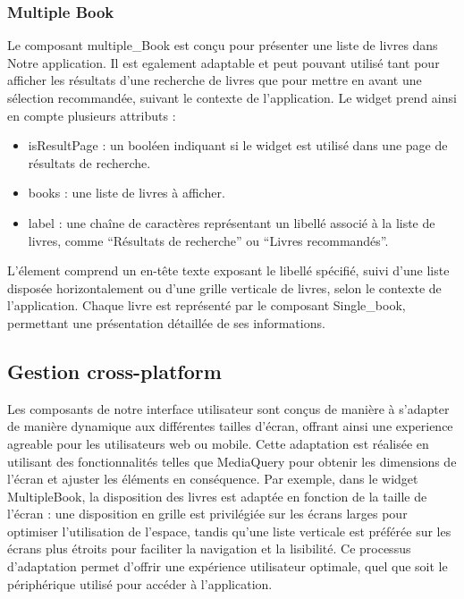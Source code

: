 \subsubsection{Multiple Book}\label{multiple-book}

Le composant multiple\_Book est conçu pour présenter une liste de livres
dans Notre application. Il est egalement adaptable et peut pouvant
utilisé tant pour afficher les résultats d'une recherche de livres que
pour mettre en avant une sélection recommandée, suivant le contexte de
l'application. Le widget prend ainsi en compte plusieurs attributs :

\begin{itemize}
\tightlist
\item
  isResultPage : un booléen indiquant si le widget est utilisé dans une
  page de résultats de recherche.
\item
  books : une liste de livres à afficher.
\item
  label : une chaîne de caractères représentant un libellé associé à la
  liste de livres, comme ``Résultats de recherche'' ou ``Livres
  recommandés''.
\end{itemize}

L'élement comprend un en-tête texte exposant le libellé spécifié, suivi
d'une liste disposée horizontalement ou d'une grille verticale de
livres, selon le contexte de l'application. Chaque livre est représenté
par le composant Single\_book, permettant une présentation détaillée de
ses informations.

\subsection{Gestion cross-platform}\label{gestion-cross-platform}

Les composants de notre interface utilisateur sont conçus de manière à
s'adapter de manière dynamique aux différentes tailles d'écran, offrant
ainsi une experience agreable pour les utilisateurs web ou mobile. Cette
adaptation est réalisée en utilisant des fonctionnalités telles que
MediaQuery pour obtenir les dimensions de l'écran et ajuster les
éléments en conséquence. Par exemple, dans le widget MultipleBook, la
disposition des livres est adaptée en fonction de la taille de l'écran :
une disposition en grille est privilégiée sur les écrans larges pour
optimiser l'utilisation de l'espace, tandis qu'une liste verticale est
préférée sur les écrans plus étroits pour faciliter la navigation et la
lisibilité. Ce processus d'adaptation permet d'offrir une expérience
utilisateur optimale, quel que soit le périphérique utilisé pour accéder
à l'application.

